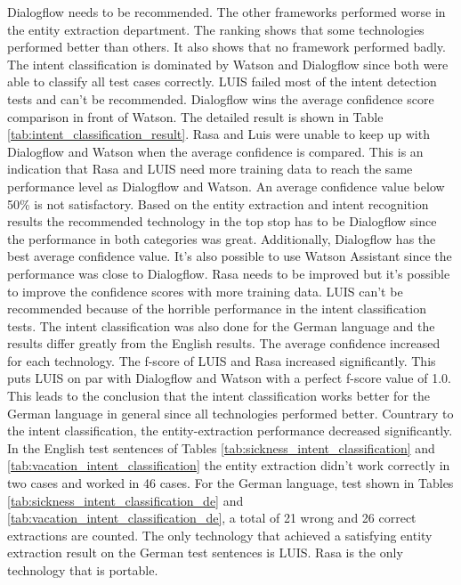Dialogflow needs to be recommended.
The other frameworks performed worse in the entity extraction 
department.
The ranking shows that some technologies performed better than others.
It also shows that no framework performed badly.
The intent classification is dominated by Watson and Dialogflow since 
both were able to classify all test cases correctly.
LUIS failed most of the intent detection tests and can't be recommended.
Dialogflow wins the average confidence score comparison in front of Watson.
The detailed result is shown in Table \ref{tab:intent_classification_result}.
Rasa and Luis were unable to keep up with Dialogflow and Watson when the 
average confidence is compared.
This is an indication that Rasa and LUIS need more training data to 
reach the same performance level as Dialogflow and Watson.
An average confidence value below 50\% is not satisfactory.
Based on the entity extraction and intent recognition results
the recommended technology in the top stop has to be Dialogflow
since the performance in both categories was great.
Additionally, Dialogflow has the best average confidence value.
It's also possible to use Watson Assistant since the performance was close to Dialogflow.
Rasa needs to be improved but it's possible to improve the confidence scores with more training data.
LUIS can't be recommended because of the horrible performance in the intent classification tests.
The intent classification was also done for the German language and the results differ greatly from the 
English results.
The average confidence increased for each technology.
The f-score of LUIS and Rasa increased significantly. 
This puts LUIS on par with Dialogflow and Watson with a perfect f-score value of 1.0.
This leads to the conclusion that the intent classification works better for the German 
language in general since all technologies performed better.
Countrary to the intent classification, the entity-extraction performance decreased significantly.
In the English test sentences of Tables \ref{tab:sickness_intent_classification} and \ref{tab:vacation_intent_classification}
the entity extraction didn't work correctly in two cases and worked in 46 cases.
For the German language, test shown in Tables \ref{tab:sickness_intent_classification_de} and \ref{tab:vacation_intent_classification_de},
a total of 21 wrong and 26 correct extractions are counted.
The only technology that achieved a satisfying entity extraction result on the German test sentences is LUIS.
Rasa is the only technology that is portable.
